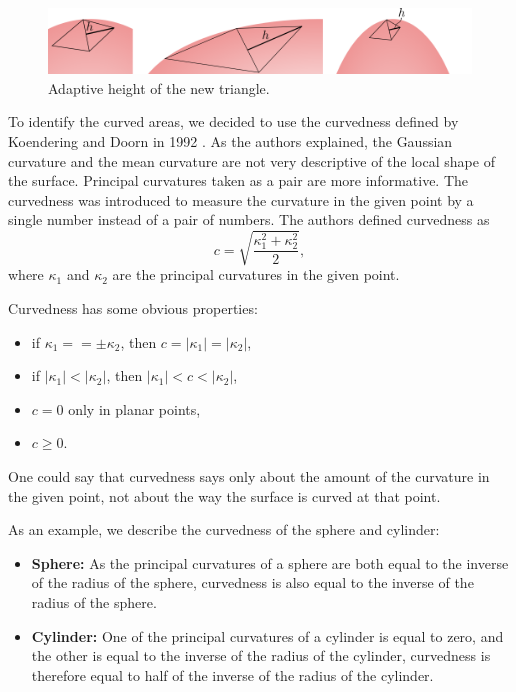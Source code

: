 \begin{figure}
    \centerline{\includegraphics[scale=0.5]{images/img15}}
    \caption[Adaptive height of the new triangle]
    {Adaptive height of the new triangle.}
    \label{img:15}
\end{figure}

To identify the curved areas, we decided to use the curvedness defined by 
Koendering and Doorn in 1992 \cite{koenderink1992surface}. As the authors 
explained, the Gaussian curvature and the mean curvature are not very descriptive
of the local shape of the surface. Principal curvatures taken as a pair
are more informative. The curvedness was introduced to measure 
the curvature in the given point by a single number instead of a
pair of numbers. The authors defined curvedness as 
$$c=\sqrt{\frac{\kappa_1^2+\kappa_2^2}{2}},$$
where $\kappa_1$ and $\kappa_2$ are the principal curvatures in the given point.

Curvedness has some obvious properties:
\begin{itemize}
    \item if $\kappa_1 == \pm\kappa_2$, then $c=|\kappa_1|=|\kappa_2|$,
    \item if $|\kappa_1|<|\kappa_2|$, then $|\kappa_1|<c<|\kappa_2|$,
    \item $c=0$ only in planar points,
    \item $c\geq0$. 
\end{itemize}

One could say that curvedness says only about the amount of the curvature
in the given point, not about the way the surface is curved at that point.

As an example, we describe the curvedness of the sphere and cylinder:
\begin{itemize}
    \item \textbf{Sphere:} As the principal curvatures of a sphere are both 
    equal to the inverse of the radius of the sphere, curvedness is also equal 
    to the inverse of the radius of the sphere.
    \item \textbf{Cylinder:} One of the principal curvatures of a cylinder
    is equal to zero, and the other is equal to the inverse of the radius of 
    the cylinder, curvedness is therefore equal to half of the inverse of 
    the radius of the cylinder.
\end{itemize}
 
